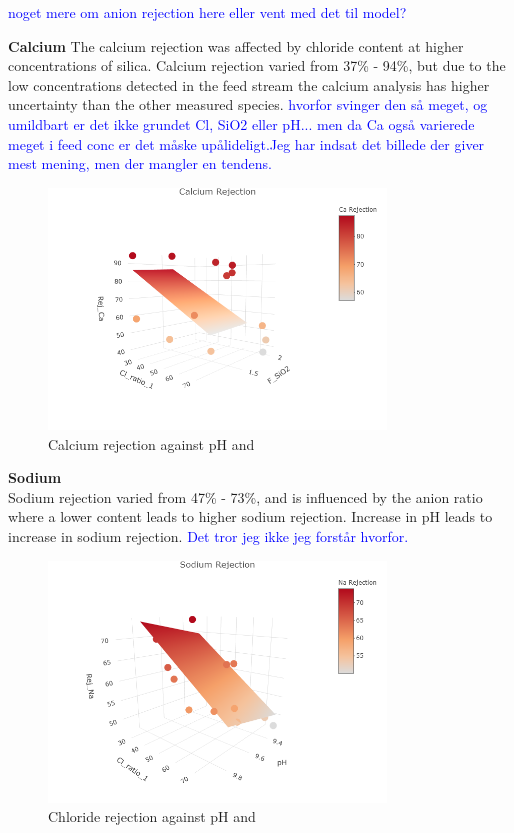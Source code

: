 \textcolor{blue}{noget mere om anion rejection here eller vent med det til model?}


\textbf{Calcium}
The calcium rejection was affected by chloride content at higher concentrations of silica.
Calcium rejection varied from 37\% - 94\%, but due to the low concentrations detected in the feed stream the calcium analysis has higher uncertainty than the other  measured species. 
\textcolor{blue}{hvorfor svinger den så meget, og umildbart er det ikke grundet Cl, SiO2 eller pH... men da Ca også varierede meget i feed conc er det måske upålideligt.Jeg har indsat det billede der giver mest mening, men der mangler en tendens.}

\begin{figure}[H]
    \centering
    \includegraphics[width=0.8\textwidth]{Billeder/data/SPRR/Calcium_rejection_3D.png}
    \caption{Calcium rejection against pH and }
    \label{fig:Calcium_rejection_3D}
\end{figure}

\textbf{Sodium}\\
Sodium rejection varied from 47\% - 73\%, and is influenced by the anion ratio where a lower  content leads to higher sodium rejection. 
Increase in pH leads to increase in sodium rejection. 
\textcolor{blue}{Det tror jeg ikke jeg forstår hvorfor. }

\begin{figure}[H]
    \centering
    \includegraphics[width=0.8\textwidth]{Billeder/data/SPRR/Sodium_rejection_3D.png}
    \caption{Chloride rejection against pH and }
    \label{fig:Sodium_rejection_3D}
\end{figure}



